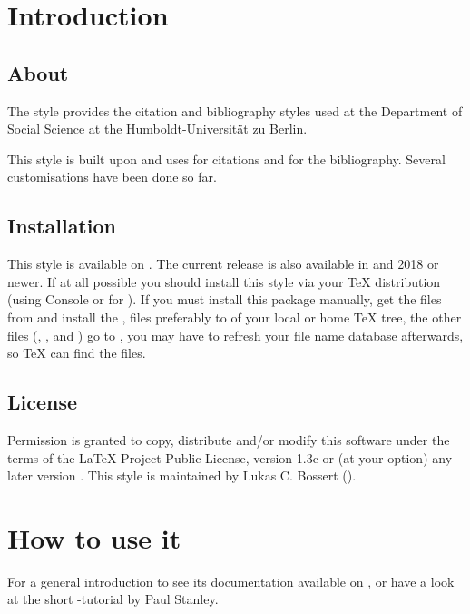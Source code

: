 \documentclass[DIV=11]{scrartcl}
\providecommand*{\printtitlepage}{}
\def\tex{TeX}%
\def\lppl{LaTeX Project Public License}%
\begin{document}
\printtitlepage
\tableofcontents

\section{Introduction}\label{sec:int}
\subsection{About}
The  style provides the citation and bibliography styles used at the Department of Social Science at the Humboldt-Universität zu Berlin.

This style is built upon  and uses  for  citations and for the bibliography.
Several customisations have been done so far.

\subsection{Installation}\label{sec:install}
This style is available on .%
The current release is also available in \miktex{} and \texlive{} 2018 or
newer.
If at all possible you should install this style via your \tex{} distribution
(using \miktex{} Console or
 for \texlive{}).
If you must install this package manually, get the files from 
and install the ,   files preferably to
 of your local or home \TeX{} tree, the other
files (, ,
 and ) go to
, you may have to refresh your file name database
afterwards, so \tex{} can find the files.

\subsection{License}\label{sec:license}
Permission is granted to copy, distribute and\slash or modify this software
under the terms of the \lppl, version 1.3c%
or (at your option) any later version%
.
This style is maintained by Lukas C. Bossert ().


\section{How to use it}
For a general introduction to  see its documentation available on ,
or have a look at the short -tutorial by Paul Stanley. 
\end{document}
